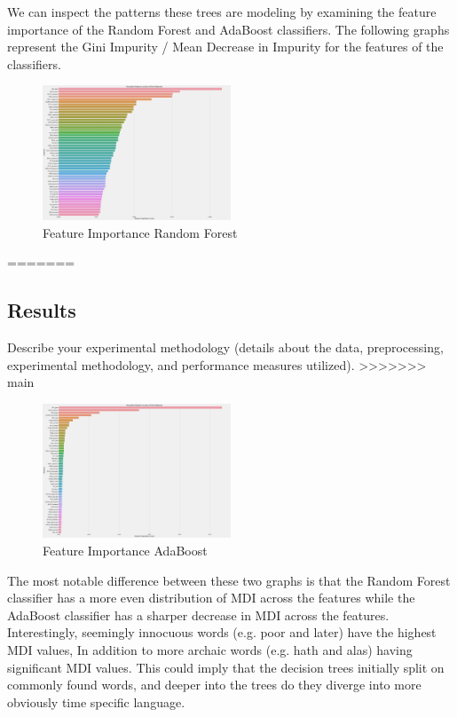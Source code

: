 \documentclass{article}
\begin{document}
We can inspect the patterns these trees are modeling by examining the feature importance
of the Random Forest and AdaBoost classifiers. The following graphs represent the Gini Impurity / Mean Decrease in Impurity
for the features of the classifiers.

\begin{figure}[h]
  \centering
  \includegraphics[width=0.5\textwidth]{figure1_featureVisualization.png}
  \caption{Feature Importance Random Forest}
  \end{figure}
=======
\subsection{Results}

Describe your experimental methodology (details about the data, preprocessing,
experimental methodology, and performance measures utilized).
>>>>>>> main

\begin{figure}[h]
  \centering
  \includegraphics[width=0.5\textwidth]{feature_adaboost.png}
  \caption{Feature Importance AdaBoost}
  \end{figure}

The most notable difference between these two graphs is that the Random Forest classifier has a more even
distribution of MDI across the features while the AdaBoost classifier has a sharper decrease in MDI across
the features. Interestingly, seemingly innocuous words (e.g. poor and later) have the highest MDI values, In
addition to more archaic words (e.g. hath and alas) having significant MDI values. This could imply that the
decision trees initially split on commonly found words, and deeper into the trees do they diverge into more
obviously time specific language.
\end{document}
